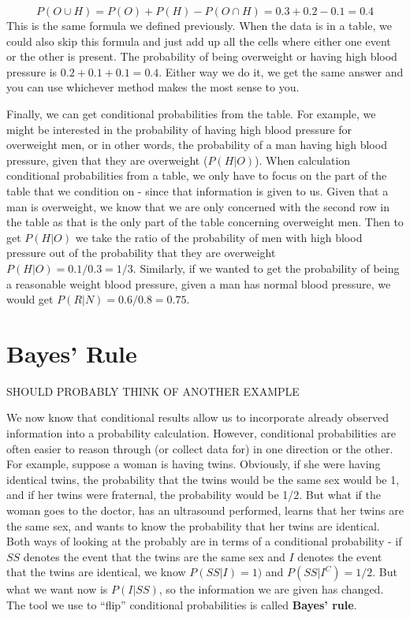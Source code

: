 \documentclass[
]{book}
\theoremstyle{definition}
\theoremstyle{definition}
\theoremstyle{definition}
\theoremstyle{remark}
\begin{document}
\[P(O \cup H) = P(O) + P(H) - P(O \cap H) = 0.3 + 0.2 - 0.1 = 0.4\]
This is the same formula we defined previously. When the data is in a table, we could also skip this formula and just add up all the cells where either one event or the other is present. The probability of being overweight or having high blood pressure is \(0.2 + 0.1 + 0.1 = 0.4\). Either way we do it, we get the same answer and you can use whichever method makes the most sense to you.

Finally, we can get conditional probabilities from the table. For example, we might be interested in the probability of having high blood pressure for overweight men, or in other words, the probability of a man having high blood pressure, given that they are overweight (\(P(H|O)\)). When calculation conditional probabilities from a table, we only have to focus on the part of the table that we condition on - since that information is given to us. Given that a man is overweight, we know that we are only concerned with the second row in the table as that is the only part of the table concerning overweight men. Then to get \(P(H|O)\) we take the ratio of the probability of men with high blood pressure out of the probability that they are overweight \(P(H|O) = 0.1 / 0.3 = 1/3\). Similarly, if we wanted to get the probability of being a reasonable weight blood pressure, given a man has normal blood pressure, we would get \(P(R|N) = 0.6 / 0.8 = 0.75\).

\hypertarget{ch4_s5}{%
\section{Bayes' Rule}\label{ch4_s5}}

SHOULD PROBABLY THINK OF ANOTHER EXAMPLE

We now know that conditional results allow us to incorporate already observed information into a probability calculation. However, conditional probabilities are often easier to reason through (or collect data for) in one direction or the other. For example, suppose a woman is having twins. Obviously, if she were having identical twins, the probability that the twins would be the same sex would be 1, and if her twins were fraternal, the probability would be 1/2. But what if the woman goes to the doctor, has an ultrasound performed, learns that her twins are the same sex, and wants to know the probability that her twins are identical. Both ways of looking at the probably are in terms of a conditional probability - if \(SS\) denotes the event that the twins are the same sex and \(I\) denotes the event that the twins are identical, we know \(P(SS|I) = 1)\) and \(P(SS|I^C) = 1/2\). But what we want now is \(P(I|SS)\), so the information we are given has changed. The tool we use to ``flip'' conditional probabilities is called \textbf{Bayes' rule}.
\end{document}
